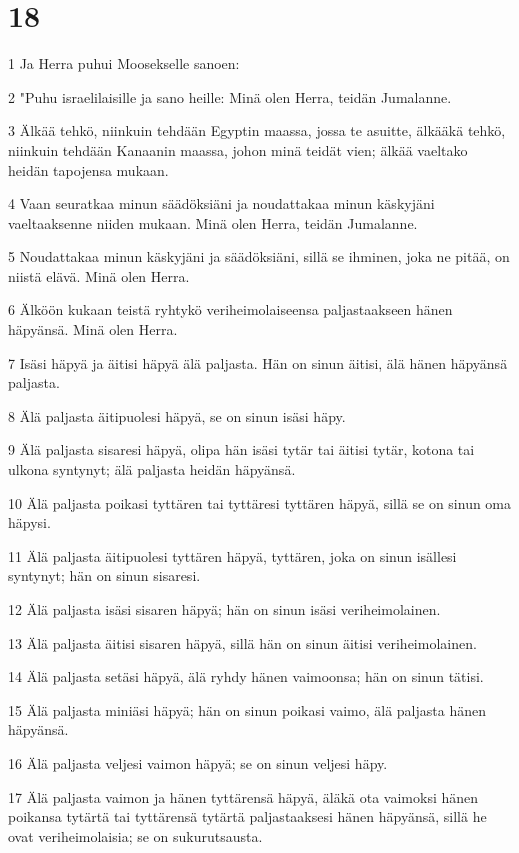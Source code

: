 \chapter{18}

\par 1 Ja Herra puhui Moosekselle sanoen:
\par 2 "Puhu israelilaisille ja sano heille: Minä olen Herra, teidän Jumalanne.
\par 3 Älkää tehkö, niinkuin tehdään Egyptin maassa, jossa te asuitte, älkääkä tehkö, niinkuin tehdään Kanaanin maassa, johon minä teidät vien; älkää vaeltako heidän tapojensa mukaan.
\par 4 Vaan seuratkaa minun säädöksiäni ja noudattakaa minun käskyjäni vaeltaaksenne niiden mukaan. Minä olen Herra, teidän Jumalanne.
\par 5 Noudattakaa minun käskyjäni ja säädöksiäni, sillä se ihminen, joka ne pitää, on niistä elävä. Minä olen Herra.
\par 6 Älköön kukaan teistä ryhtykö veriheimolaiseensa paljastaakseen hänen häpyänsä. Minä olen Herra.
\par 7 Isäsi häpyä ja äitisi häpyä älä paljasta. Hän on sinun äitisi, älä hänen häpyänsä paljasta.
\par 8 Älä paljasta äitipuolesi häpyä, se on sinun isäsi häpy.
\par 9 Älä paljasta sisaresi häpyä, olipa hän isäsi tytär tai äitisi tytär, kotona tai ulkona syntynyt; älä paljasta heidän häpyänsä.
\par 10 Älä paljasta poikasi tyttären tai tyttäresi tyttären häpyä, sillä se on sinun oma häpysi.
\par 11 Älä paljasta äitipuolesi tyttären häpyä, tyttären, joka on sinun isällesi syntynyt; hän on sinun sisaresi.
\par 12 Älä paljasta isäsi sisaren häpyä; hän on sinun isäsi veriheimolainen.
\par 13 Älä paljasta äitisi sisaren häpyä, sillä hän on sinun äitisi veriheimolainen.
\par 14 Älä paljasta setäsi häpyä, älä ryhdy hänen vaimoonsa; hän on sinun tätisi.
\par 15 Älä paljasta miniäsi häpyä; hän on sinun poikasi vaimo, älä paljasta hänen häpyänsä.
\par 16 Älä paljasta veljesi vaimon häpyä; se on sinun veljesi häpy.
\par 17 Älä paljasta vaimon ja hänen tyttärensä häpyä, äläkä ota vaimoksi hänen poikansa tytärtä tai tyttärensä tytärtä paljastaaksesi hänen häpyänsä, sillä he ovat veriheimolaisia; se on sukurutsausta.
